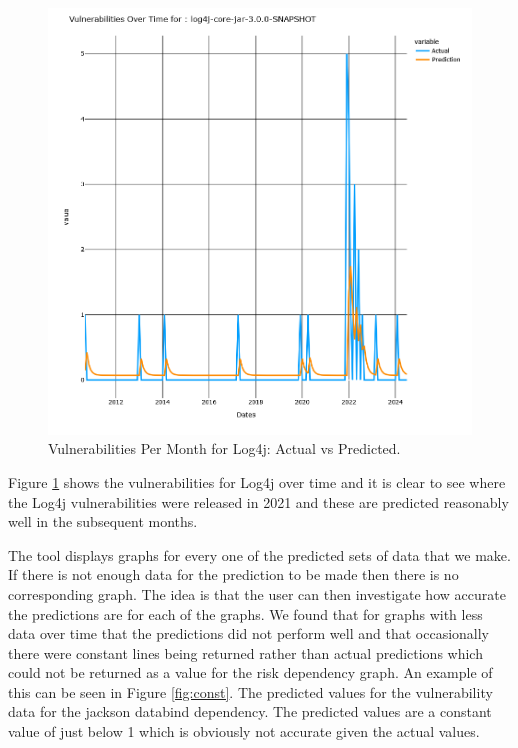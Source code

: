 \documentclass[conference]{IEEEtran}
\begin{document}
\begin{figure}[H]
    \centering
    \includegraphics[width=1\linewidth]{Log4jVuls.png}
    \caption{Vulnerabilities Per Month for Log4j: Actual vs Predicted.} 
    \label{fig:vulns}
\end{figure}

Figure \ref{fig:vulns} shows the vulnerabilities for Log4j over time and it is clear to see where the Log4j vulnerabilities were released in 2021 and these are predicted reasonably well in the subsequent months. 

The tool displays graphs for every one of the predicted sets of data that we make. If there is not enough data for the prediction to be made then there is no corresponding graph. The idea is that the user can then investigate how accurate the predictions are for each of the graphs. We found that for graphs with less data over time that the predictions did not perform well and that occasionally there were constant lines being returned rather than actual predictions which could not be returned as a value for the risk dependency graph. An example of this can be seen in Figure \ref{fig:const}. The predicted values for the vulnerability data for the jackson databind dependency. The predicted values are a constant value of just below 1 which is obviously not accurate given the actual values. 
\end{document}

